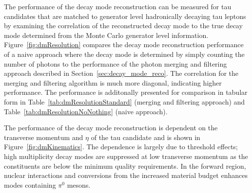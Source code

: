 The performance of the decay mode reconstruction can be measured for
tau candidates that are matched to generator level hadronically decaying tau
leptons by examining the correlation of the reconstructed decay mode to the true
decay mode determined from the Monte Carlo generator level information.
Figure~\ref{fig:dmResolution} compares the decay mode reconstruction performance
of a naive approach where the decay mode is determined by simply counting the
number of photons to the performance of the photon merging and filtering
approach described in Section~\ref{sec:decay_mode_reco}.  The correlation for
the merging and filtering algorithm is much more diagonal, indicating higher
performance.  The performance is additonally presented for comparison in tabular form in
Table~\ref{tab:dmResolutionStandard} (merging and filtering approach) and
Table~\ref{tab:dmResolutionNoNothing} (naive approach).

The performance of the decay mode reconstruction is dependent on the transverse
momentum and $\eta$ of the tau candidate and is shown in
Figure~\ref{fig:dmKinematics}.  The \pt dependence is largely due to
threshold effects; high multiplicity decay modes are suppressed at low
transverse momentum as the constituents are below the minimum \pt quality
requirements.  In the forward region, nuclear interactions and conversions from
the increased material budget enhances modes containing $\pi^0$ mesons.




